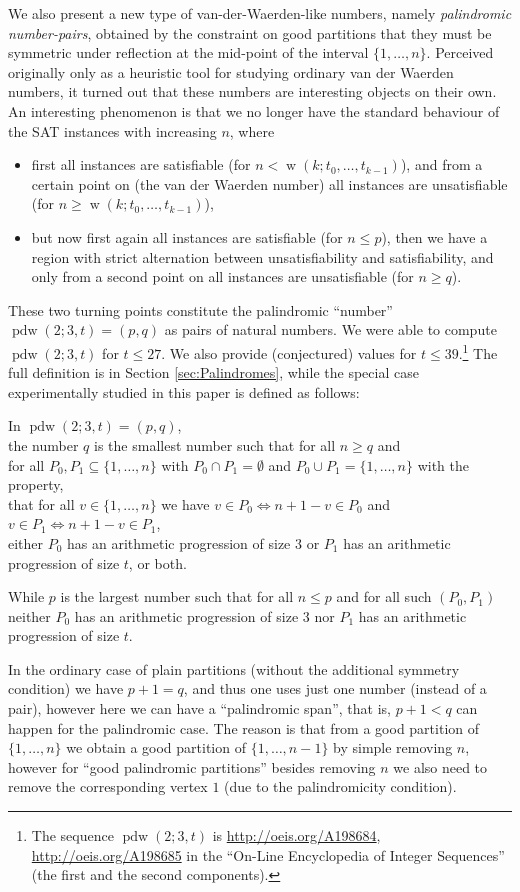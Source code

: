 \documentclass[final,3p,times]{elsarticle}
\theoremstyle{definition}
\newcommand{\set}[1]{\{#1\}}
\renewcommand{\leq}{\le} %
\DeclareMathOperator{\vdw}{w}
\DeclareMathOperator{\vdwpd}{pdw}
\begin{document}
We also present a new type of van-der-Waerden-like numbers, namely \emph{palindromic number-pairs}, obtained by the constraint on good partitions that they must be symmetric under reflection at the mid-point of the interval $\set{1,\dots,n}$. Perceived originally only as a heuristic tool for studying ordinary van der Waerden numbers, it turned out that these numbers are interesting objects on their own. An interesting phenomenon is that we no longer have the standard behaviour of the SAT instances with increasing $n$, where
\begin{itemize}
\item first all instances are satisfiable (for $n < \vdw(k;t_0,\dots,t_{k-1})$), and from a certain point on (the van der Waerden number) all instances are unsatisfiable (for $n \geq \vdw(k;t_0,\dots,t_{k-1})$),
\item but now first again all instances are satisfiable (for $n \leq p$), then we have a region with strict alternation between unsatisfiability and satisfiability, and only from a second point on all instances are unsatisfiable (for $n \geq q$).
\end{itemize}
These two turning points constitute the palindromic ``number'' $\vdwpd(2;3,t) = (p,q)$ as pairs of natural numbers. We were able to compute $\vdwpd(2;3,t)$ for $t \leq 27$. We also provide (conjectured) values for $t \leq 39$.\footnote{The sequence $\vdwpd(2;3,t)$ is \url{http://oeis.org/A198684}, \url{http://oeis.org/A198685} in the ``On-Line Encyclopedia of Integer Sequences'' (the first and the second components).} The full definition is in Section \ref{sec:Palindromes}, while the special case experimentally studied in this paper is defined as follows:
\begin{center}
  In $\vdwpd(2;3,t) = (p,q)$,\\
  the number $q$ is the smallest number such that for all $n \geq q$ and\\
  for all $P_0, P_1 \subseteq \set{1,\dots,n}$ with $P_0 \cap P_1 = \emptyset$ and $P_0 \cup P_1 = \set{1,\dots,n}$ with the property,\\
  that for all $v \in \set{1,\dots,n}$ we have $v \in P_0 \Leftrightarrow n+1-v \in P_0$ and $v \in P_1 \Leftrightarrow n+1-v \in P_1$,\\
  either $P_0$ has an arithmetic progression of size $3$ or $P_1$ has an arithmetic progression of size $t$, or both.

  While $p$ is the largest number such that for all $n \leq p$ and for all such $(P_0, P_1)$\\
  neither $P_0$ has an arithmetic progression of size $3$ nor $P_1$ has an arithmetic progression of size $t$.
\end{center}
In the ordinary case of plain partitions (without the additional symmetry condition) we have $p+1 = q$, and thus one uses just one number (instead of a pair), however here we can have a ``palindromic span'', that is, $p+1 < q$ can happen for the palindromic case. The reason is that from a good partition of $\set{1,\dots,n}$ we obtain a good partition of $\set{1,\dots,n-1}$ by simple removing $n$, however for ``good palindromic partitions'' besides removing $n$ we also need to remove the corresponding vertex $1$ (due to the palindromicity condition).
\end{document}
